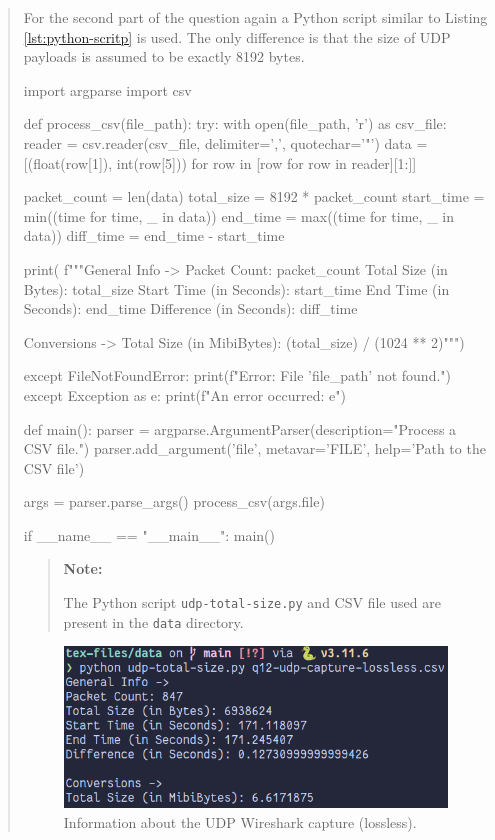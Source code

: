 \documentclass{article}
\newenvironment{ans}
{\fbox{Answer}\begin{quote}\nopagebreak}
{\end{quote}}
\newenvironment{note}{%
\begin{quote}
\begin{tcolorbox}[colback=gray!10,arc=0mm,boxrule=0pt]
\raggedright
\textbf{Note:}%
}{%
\end{tcolorbox}
\end{quote}%
}
\begin{document}
\begin{ans}
For the second part of the question again a Python script
similar to Listing \ref{lst:python-scritp} is used. The
only difference is that the size of UDP payloads is assumed
to be exactly 8192 bytes.
\begin{gruvboxlisting}[language=Python, caption={A Python script for computing a
number the total size of a number of maximum size (8192 bytes) UDP packets.}]
import argparse
import csv

def process_csv(file_path): try: with open(file_path, 'r')
as csv_file: reader = csv.reader(csv_file, delimiter=',',
quotechar='"') data = [(float(row[1]), int(row[5])) for row
in [row for row in reader][1:]]

packet_count = len(data) total_size = 8192 * packet_count
start_time = min((time for time, _ in data)) end_time =
max((time for time, _ in data)) diff_time = end_time -
start_time

print( f"""General Info -> Packet Count: {packet_count}
Total Size (in Bytes): {total_size} Start Time (in
Seconds): {start_time} End Time (in Seconds): {end_time}
Difference (in Seconds): {diff_time}

Conversions -> Total Size (in MibiBytes): {(total_size) /
(1024 ** 2)}""")

except FileNotFoundError: print(f"Error: File '{file_path}'
not found.") except Exception as e: print(f"An error
occurred: {e}")

def main(): parser =
argparse.ArgumentParser(description="Process a CSV file.")
parser.add_argument('file', metavar='FILE', help='Path to
the CSV file')

args = parser.parse_args() process_csv(args.file)

if __name__ == "__main__": main()
\end{gruvboxlisting}

\begin{note}
The Python script \texttt{udp-total-size.py} and CSV file used
are present in the \texttt{data} directory.
\end{note}

\begin{figure}[H]
\centering
\includegraphics[width=13cm]{data/q12-udp-capture-stats.png}
\caption{Information about the UDP Wireshark capture (lossless).}
\label{fig:q12-udp-capture-info}
\end{figure}


\end{ans}
\end{document}
